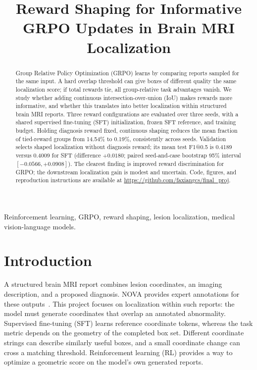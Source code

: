 \documentclass[conference]{IEEEtran}
\begin{document}
\title{Reward Shaping for Informative GRPO Updates in Brain MRI Localization}
\author{
}
\maketitle

\begin{abstract}
Group Relative Policy Optimization (GRPO) learns by comparing reports sampled for the same input. A hard overlap threshold can give boxes of different quality the same localization score; if total rewards tie, all group-relative task advantages vanish. We study whether adding continuous intersection-over-union (IoU) makes rewards more informative, and whether this translates into better localization within structured brain MRI reports. Three reward configurations are evaluated over three seeds, with a shared supervised fine-tuning (SFT) initialization, frozen SFT reference, and training budget. Holding diagnosis reward fixed, continuous shaping reduces the mean fraction of tied-reward groups from 14.54\% to 0.19\%, consistently across seeds. Validation selects shaped localization without diagnosis reward; its mean test F1@0.5 is 0.4189 versus 0.4009 for SFT (difference $+0.0180$; paired seed-and-case bootstrap 95\% interval $[-0.0566,+0.0908]$). The clearest finding is improved reward discrimination for GRPO; the downstream localization gain is modest and uncertain. Code, figures, and reproduction instructions are available at \url{https://github.com/faxiangcs/final_proj}.
\end{abstract}

\begin{IEEEkeywords}
Reinforcement learning, GRPO, reward shaping, lesion localization, medical vision-language models.
\end{IEEEkeywords}

\section{Introduction}
A structured brain MRI report combines lesion coordinates, an imaging description, and a proposed diagnosis. NOVA provides expert annotations for these outputs~\cite{nova}. This project focuses on localization within such reports: the model must generate coordinates that overlap an annotated abnormality. Supervised fine-tuning (SFT) learns reference coordinate tokens, whereas the task metric depends on the geometry of the completed box set. Different coordinate strings can describe similarly useful boxes, and a small coordinate change can cross a matching threshold. Reinforcement learning (RL) provides a way to optimize a geometric score on the model's own generated reports.
\end{document}
